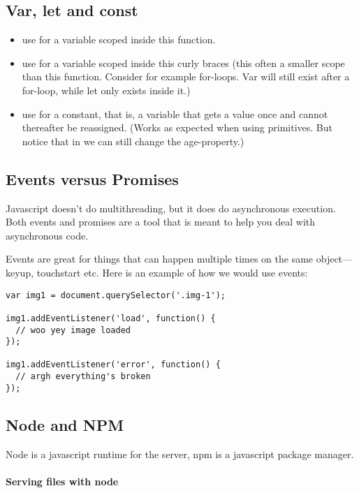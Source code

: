 \subsection{Var, let and const}
\begin{itemize}
    \item use  for a variable scoped inside this function. 
    \item use  for a variable scoped inside this curly braces (this often a smaller scope than this function. Consider for example for-loops. Var will still exist after a for-loop, while let only exists inside it.) 
    \item use  for a constant, that is, a variable that gets a value once and cannot  thereafter be reassigned. (Works as expected when using primitives. But notice that in  we can still change the age-property.)
\end{itemize}


\subsection{Events versus Promises}
Javascript doesn't do multithreading, but it does do asynchronous execution. Both events and promises are a tool that is meant to help you deal with asynchronous code. 

Events are great for things that can happen multiple times on the same object—keyup, touchstart etc. Here is an example of how we would use events: 
\begin{lstlisting}
var img1 = document.querySelector('.img-1');

img1.addEventListener('load', function() {
  // woo yey image loaded
});

img1.addEventListener('error', function() {
  // argh everything's broken
});

\end{lstlisting}


\subsection{Node and NPM}
Node is a javascript runtime for the server, npm is a javascript package manager. 

\paragraph{Serving files with node}


